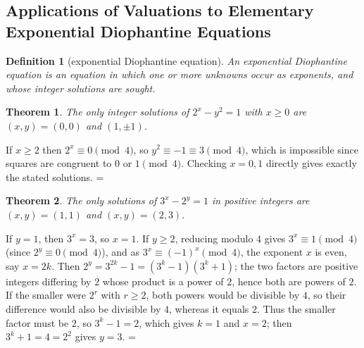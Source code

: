 \documentclass[11pt]{article}
\makeatletter
\let\nt@closedisplay\]
\def\nt@guardedclose{\@ifnextchar\par{\nt@closeafterpar}{\@ifnextchar\end{\postdisplaypenalty\@M\nt@closedisplay}{\nt@closedisplay}}}
\def\nt@closeafterpar\par{\@ifnextchar\par{\nt@closeafterpar}{\@ifnextchar\end{\postdisplaypenalty\@M\nt@closedisplay\par}{\nt@closedisplay\par}}}
\renewenvironment{proof}[1][\proofname]{\par
  \pushQED{\qed}\normalfont\topsep\medskipamount\edef\nt@afterproof{\@endparpenalty=\the\@endparpenalty\relax}\@beginparpenalty\@M\@endparpenalty\@M\let\]\nt@guardedclose\trivlist\item[]\textit{#1\@addpunct{.}} \ignorespaces}{\ifvmode\addpenalty\@M\fi\popQED\nt@afterproof\endtrivlist\@endpefalse}
\theoremstyle{ntstyle}
\newtheorem{theorem}{Theorem}[subsection]
\newtheorem{definition}{Definition}[subsection]
\makeatother
\begin{document}
\subsection{Applications of Valuations to Elementary Exponential Diophantine Equations}

\begin{definition}[exponential Diophantine equation]\label{def:4.9.1}\label{def:exponential-diophantine-equation}
  An exponential Diophantine equation is an equation in which one or more unknowns occur as exponents, and whose
  integer solutions are sought.

\end{definition}

\begin{theorem}\label{thm:4.9.1}
  The only integer solutions of $2^x-y^2=1$ with $x\ge0$ are $(x,y)=(0,0)$
  and $(1,\pm1)$.

\end{theorem}

\begin{proof} If $x\ge2$ then $2^{x}\equiv0\pmod{4}$, so
  $y^{2}\equiv-1\equiv3\pmod{4}$, which is impossible since squares are
  congruent to $0$ or $1\pmod{4}$. Checking $x=0,1$ directly gives exactly the stated
  solutions.
\end{proof}

\begin{theorem}\label{thm:4.9.2}
  The only solutions of $3^x-2^y=1$ in positive integers are $(x,y)=(1,1)$
  and $(x,y)=(2,3)$.

\end{theorem}

\begin{proof} If $y=1$, then $3^{x}=3$, so $x=1$. If
  $y\ge2$, reducing modulo $4$ gives $3^{x}\equiv1\pmod{4}$ (since
  $2^{y}\equiv0\pmod{4}$), and as $3^{x}\equiv(-1)^{x}\pmod{4}$, the exponent $x$ is even, say
  $x=2k$. Then $2^{y}=3^{2k}-1=(3^{k}-1)(3^{k}+1)$; the two factors are
  positive integers differing by $2$ whose product is a power of $2$,
  hence both are powers of $2$. If the smaller were $2^r$ with
  $r\ge2$, both powers would be divisible by $4$, so their difference
  would also be divisible by $4$, whereas it equals $2$. Thus the smaller factor
  must be $2$, so
  $3^{k}-1=2$, which gives $k=1$ and $x=2$; then $3^{k}+1=4=2^{2}$ gives
  $y=3$.
\end{proof}
\end{document}

